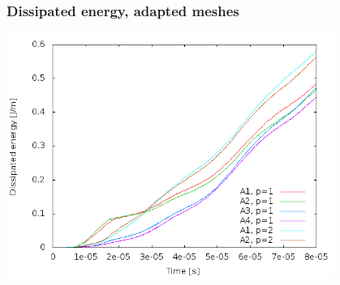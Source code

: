 \documentclass{beamer}
\begin{document}
\begin{frame}
  \frametitle{Dissipated energy, adapted meshes}
  \begin{center}
    \includegraphics[width=0.8\textwidth]{figs/dissipEnergy-AMR}
  \end{center}
\end{frame}
\end{document}
